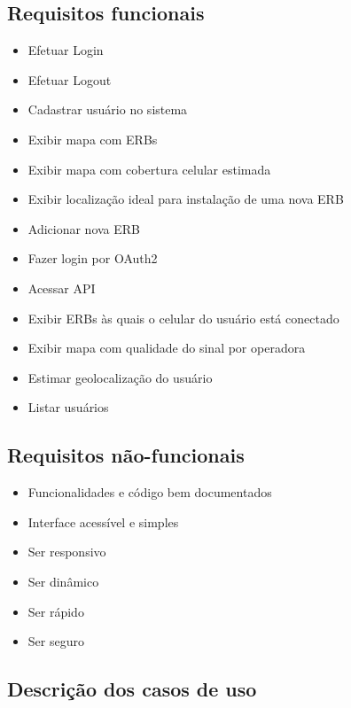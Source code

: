 \documentclass[]{politex}
\begin{document}
\subsection{Requisitos funcionais}
\begin{itemize}
\item Efetuar Login
\item Efetuar Logout
\item Cadastrar usuário no sistema
\item Exibir mapa com ERBs
\item Exibir mapa com cobertura celular estimada
\item Exibir localização ideal para instalação de uma nova ERB
\item Adicionar nova ERB
\item Fazer login por OAuth2
\item Acessar API
\item Exibir ERBs às quais o celular do usuário está conectado
\item Exibir mapa com qualidade do sinal por operadora
\item Estimar geolocalização do usuário
\item Listar usuários
\end{itemize}

\subsection{Requisitos não-funcionais}
\begin{itemize}
\item Funcionalidades e código bem documentados
\item Interface acessível e simples
\item Ser responsivo
\item Ser dinâmico
\item Ser rápido
\item Ser seguro
\end{itemize}

\subsection{Descrição dos casos de uso}
\end{document}
